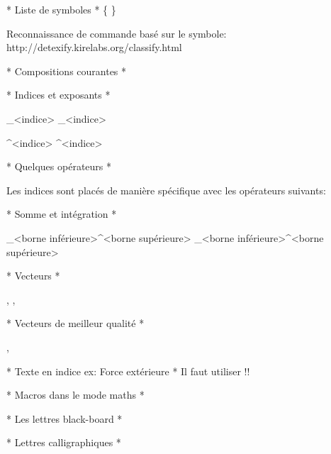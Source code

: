 
* Liste de symboles *
\lambda
\Lambda
\phi
\varphi
\Phi
\pi
\Pi
\zeta
\sigma
\Sigma
\infty
\cos
\lim
\ln
\leq
\geq
\leqslant %
\geqslant  %
\int %
\sum
\pm %
\mp %
\cup %
\cap %
\{
\}
\imath %
\jmath %
\forall
\exists

\Rightarrow
\Longrightarrow
\implies %
\Leftrightarrow
\Longleftrightarrow
\iff %
\Leftarrow
\Longleftarrow
\impliedby %
\rightarrow
\longrightarrow
\to %

Reconnaissance de commande basé sur le symbole: 
http://detexify.kirelabs.org/classify.html

* Compositions courantes *


* Indices et exposants *

_<indice>
_{<indice>} %

^<indice>
^{<indice>}

* Quelques opérateurs *

\cos \sin \tan \ln \log \exp \lim \max \min \sup \inf
\liminf \limsup \ker \dim \det \hom \arg \arccos 
\arcsin \arctan

Les indices sont placés de manière spécifique avec les opérateurs suivants: \lim \max \min \sup \inf \liminf \limsup \det

* Somme et intégration *

\sum_{<borne inférieure>}^{<borne supérieure>}
\int_{<borne inférieure>}^{<borne supérieure>}

* Vecteurs *

, \vec{\imath}, \vec{\jmath}

* Vecteurs de meilleur qualité *
\usepackage{esvect}

, 
 

* Texte en indice ex: Force extérieure *
Il faut utiliser  !!

* Macros dans le mode maths *
\newcommand{\Fext}{\vv{F}_{\text{ext}}}

* Les lettres black-board *


* Lettres calligraphiques *
\usepackage{mathrsfs}

